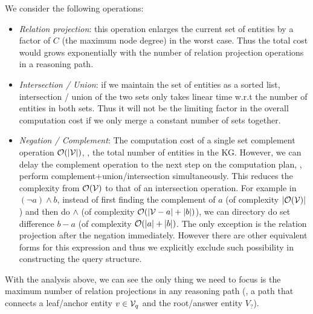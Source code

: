 We consider the following operations: 
\begin{itemize}[noitemsep,topsep=0pt,parsep=0pt,partopsep=0pt, leftmargin=*]
    \item \textit{Relation projection}: this operation enlarges the current set of entities by a factor of $C$ (the maximum node degree) in the worst case. Thus the total cost would grows exponentially with the number of relation projection operations in a reasoning path.
    \item \textit{Intersection / Union}: if we maintain the set of entities as a sorted list, intersection / union of the two sets only takes linear time w.r.t the number of entities in both sets. Thus it will not be the limiting factor in the overall computation cost if we only merge a constant number of sets together. 
    \item \textit{Negation / Complement}: The computation cost of a single set complement operation $\mathcal{O}(|\mathcal{V}|)$, \ie, the total number of entities in the KG. However, we can delay the complement operation to the next step on the computation plan, \ie, perform complement+union/intersection simultaneously. This reduces the complexity from $\mathcal{O}(\mathcal{V})$ to that of an intersection operation. For example in $(\neg a) \wedge b$, instead of first finding the complement of $a$ (of complexity $|\mathcal{O}(\mathcal{V})|$) and then do $\wedge$ (of complexity $\mathcal{O}(|\mathcal{V}-a|+|b|)$), we can directory do set difference $b-a$ (of complexity $\mathcal{O}(|a|+|b|)$.
    The only exception is the relation projection after the negation immediately. However there are other equivalent forms for this expression and thus we explicitly exclude such possibility in constructing the query structure.
\end{itemize}
With the analysis above, we can see the only thing we need to focus is the maximum number of relation projections in any reasoning path (\ie, a path that connects a leaf/anchor entity $v\in \mathcal{V}_q$ and the root/answer entity $V_?$).

